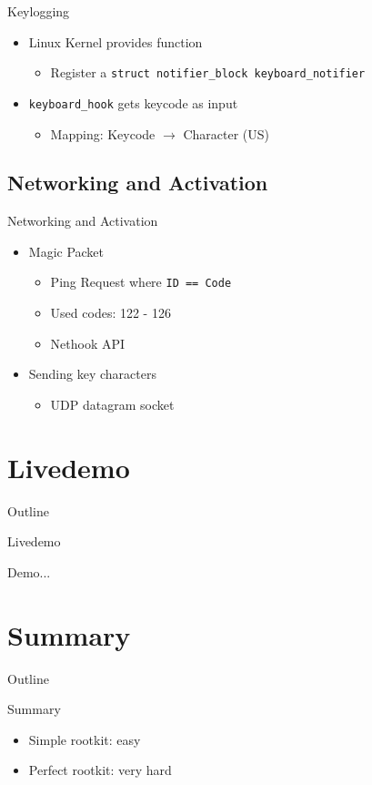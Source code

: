 \documentclass[]{beamer}
\begin{document}
\begin{frame}[t]{Keylogging}
  \begin{itemize}
    \item Linux Kernel provides function
    \begin{itemize}
      \item Register a \lstinline{struct notifier_block keyboard_notifier}
    \end{itemize}
    \item \lstinline{keyboard_hook} gets keycode as input
    \begin{itemize}
      \item Mapping: Keycode $\rightarrow$ Character (US)
    \end{itemize}
  \end{itemize}
  
\end{frame}



\subsection{Networking and Activation}

\begin{frame}[t]{Networking and Activation}
  \begin{itemize}
    \item Magic Packet
    \begin{itemize}
      \item Ping Request where \lstinline{ID == Code}
      \item Used codes: 122 - 126
      \item Nethook API
    \end{itemize}
    \item Sending key characters
    \begin{itemize}
      \item UDP datagram socket
    \end{itemize}
  \end{itemize}
\end{frame}


\section{Livedemo}
\begin{frame}[t]{Outline}
  \tableofcontents[currentsection]
\end{frame}

\begin{frame}[t]{Livedemo}
   \begin{center} \LARGE{Demo...} \end{center}
\end{frame}

\section{Summary}
\begin{frame}[t]{Outline}
\tableofcontents[currentsection]
\end{frame}

\begin{frame}[t]{Summary}
\begin{itemize}
  \item Simple rootkit: easy
  \item Perfect rootkit: very hard
\end{itemize}
\end{frame}
\end{document}
